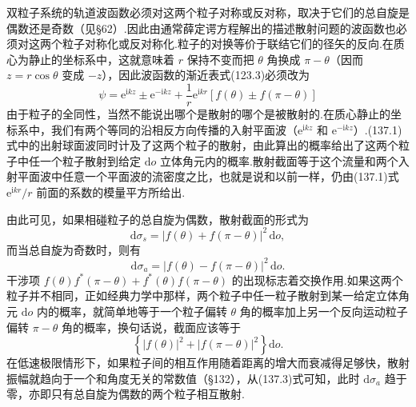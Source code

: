 双粒子系统的轨道波函数必须对这两个粒子对称或反对称，取决于它们的总自旋是偶数还是奇数（见§62）.因此由通常薛定谔方程解出的描述散射问题的波函数也必须对这两个粒子对称化或反对称化.粒子的对换等价于联结它们的径矢的反向.在质心为静止的坐标系中，这就意味着 $r$ 保持不变而把 $\theta$ 角换成 $\pi-\theta$（因而 $z=r\cos\theta$ 变成 $-z$），因此波函数的渐近表式(123.3)必须改为
\begin{equation}
  \psi=\mathrm{e}^{\mathrm{i}kz}\pm\mathrm{e}^{-\mathrm{i}kz}
  +\frac{1}{r}\mathrm{e}^{\mathrm{i}kr}
  \left[f(\theta)\pm f(\pi-\theta)\right]
\end{equation}
由于粒子的全同性，当然不能说出哪个是散射的哪个是被散射的.在质心静止的坐标系中，我们有两个等同的沿相反方向传播的入射平面波（$\mathrm{e}^{\mathrm{i}kz}$ 和 $\mathrm{e}^{-\mathrm{i}kz}$）.(137.1)式中的出射球面波同时计及了这两个粒子的散射，由此算出的概率给出了这两个粒子中任一个粒子散射到给定 $\mathrm{d}o$ 立体角元内的概率.散射截面等于这个流量和两个入射平面波中任意一个平面波的流密度之比，也就是说和以前一样，仍由(137.1)式 $\mathrm{e}^{\mathrm{i}kr}/r$ 前面的系数的模量平方所给出.

由此可见，如果相碰粒子的总自旋为偶数，散射截面的形式为
\begin{equation}
  \mathrm{d}\sigma_{s}=
  |f(\theta)+f(\pi-\theta)|^2\,\mathrm{d}o,
\end{equation}
而当总自旋为奇数时，则有
\begin{equation}
  \mathrm{d}\sigma_{a}=
  |f(\theta)-f(\pi-\theta)|^2\,\mathrm{d}o.
\end{equation}
干涉项 $f(\theta)f^{*}(\pi-\theta)+f^{*}(\theta)f(\pi-\theta)$ 的出现标志着交换作用.如果这两个粒子并不相同，正如经典力学中那样，两个粒子中任一粒子散射到某一给定立体角元 $\mathrm{d}o$ 内的概率，就简单地等于一个粒子偏转 $\theta$ 角的概率加上另一个反向运动粒子偏转 $\pi-\theta$ 角的概率，换句话说，截面应该等于
\begin{equation*}
  \left\{|f(\theta)|^2+|f(\pi-\theta)|^2\right\}\mathrm{d}o.
\end{equation*}
在低速极限情形下，如果粒子间的相互作用随着距离的增大而衰减得足够快，散射振幅就趋向于一个和角度无关的常数值（§132），从(137.3)式可知，此时 $\mathrm{d}\sigma_a$ 趋于零，亦即只有总自旋为偶数的两个粒子相互散射.

